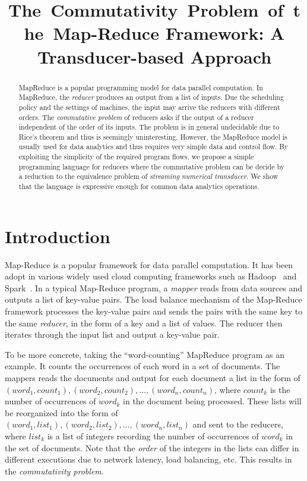 \documentclass[runningheads,a4paper]{llncs}
\title{The~Commutativity~Problem~of~the~Map-Reduce Framework: A Transducer-based Approach}
\author{}
\institute{}
\begin{document}
\maketitle

\begin{abstract}

MapReduce is a popular programming model for data parallel computation. 
In MapReduce, the \emph{reducer} produces an output from a list of inputs. Due the scheduling policy and the settings of machines, the input may arrive the reducers with different orders. The \emph{commutative problem} of reducers asks if the output of a reducer independent of the order of its inputs. The problem is in general undecidable due to Rice's theorem and thus is seemingly uninteresting. However, the MapReduce model is usually used for data analytics and thus requires very simple data and control flow. 
By exploiting the simplicity of the required program flows, we propose a simple programming language for reducers where the commutative problem can be decide by a reduction to the equivalence problem of \emph{streaming numerical transducer}. 
We show that the language is expressive enough for common data analytics operations.
\end{abstract}

\section{Introduction}
Map-Reduce is a  popular framework for data parallel computation. It has been adopt in various widely used cloud computing frameworks such as Hadoop~\cite{Hadoop} and Spark~\cite{Spark}. In a typical Map-Reduce program, a \emph{mapper} reads from data sources and outputs a list of key-value pairs. The load balance mechanism of the Map-Reduce framework processes the key-value pairs and sends the pairs with the same key to the same \emph{reducer}, in the form of a key and a list of values. The reducer then iterates through the input list and output a key-value pair.

To be more concrete, taking the ``word-counting'' MapReduce program as an example. It counts the occurrences of each word in a set of documents. The mappers reads the documents and output for each document a list in the form of $(word_1, count_1), (word_2, count_2), \ldots, (word_n, count_n)$, where $count_k$ is the number of occurrences of $word_k$ in the document being processed. These lists will be reorganized into the form of $(word_1, list_1), (word_2,list_2), \ldots, (word_n,list_n)$ and sent to the reducers, where $list_k$ is a list of integers recording the number of occurrences of $word_k$ in the set of documents. Note that the \emph{order} of the integers in the lists can differ in different executions due to network latency, load balancing, etc.
This results in the \emph{commutativity problem}.
\end{document}
